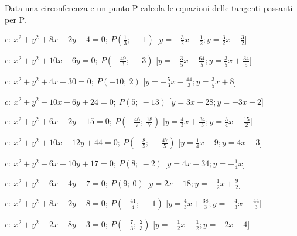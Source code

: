 \begin{esercizio}\label{ese:}
 Data una circonferenza e un punto P calcola le equazioni delle tangenti 
passanti per P.
 \begin{enumeratea}
  \item  \(c:~x^2 + y^2 +8x +2y +4 = 0;~P \left (\frac{1}{3};~-1 \right )\)
   \hfill [\(y = -\frac{3}{2} x -\frac{1}{2}; y = \frac{3}{2} x 
-\frac{3}{2}\)]
  \item  \(c:~x^2 + y^2 +10x +6y  = 0;~P \left (-\frac{49}{3};~-3 \right )\)
   \hfill [\(y = -\frac{3}{5} x -\frac{64}{5}; y = \frac{3}{5} x 
+\frac{34}{5}\)]
  \item  \(c:~x^2 + y^2 +4x -30 = 0;~P \left (-10;~2 \right )\)
   \hfill [\(y = -\frac{5}{3} x -\frac{44}{3}; y = \frac{3}{5} x +8\)]
  \item  \(c:~x^2 + y^2 -10x +6y +24 = 0;~P \left (5;~-13 \right )\)
   \hfill [\(y = 3 x -28; y = -3 x +2\)]
  \item  \(c:~x^2 + y^2 +6x +2y -15 = 0;~P \left (-\frac{46}{7};~\frac{18}{7} 
\right )\)
   \hfill [\(y = \frac{4}{3} x +\frac{34}{3}; y = \frac{3}{4} x 
+\frac{15}{2}\)]
  \item  \(c:~x^2 + y^2 +10x +12y +44 = 0;~P \left 
(-\frac{8}{5};~-\frac{47}{5} \right )\)
   \hfill [\(y = \frac{1}{4} x -9; y = 4 x -3\)]
  \item  \(c:~x^2 + y^2 -6x +10y +17 = 0;~P \left (8;~-2 \right )\)
   \hfill [\(y = 4 x -34; y = -\frac{1}{4} x \)]
  \item  \(c:~x^2 + y^2 -6x +4y -7 = 0;~P \left (9;~0 \right )\)
   \hfill [\(y = 2 x -18; y = -\frac{1}{2} x +\frac{9}{2}\)]
  \item  \(c:~x^2 + y^2 +8x +2y -8 = 0;~P \left (-\frac{41}{4};~-1 \right )\)
   \hfill [\(y = \frac{4}{3} x +\frac{38}{3}; y = -\frac{4}{3} x 
-\frac{44}{3}\)]
  \item  \(c:~x^2 + y^2 -2x -8y -3 = 0;~P \left (-\frac{7}{3};~\frac{2}{3} 
\right )\)
   \hfill [\(y = -\frac{1}{2} x -\frac{1}{2}; y = -2 x -4\)]
 \end{enumeratea}
\end{esercizio}

